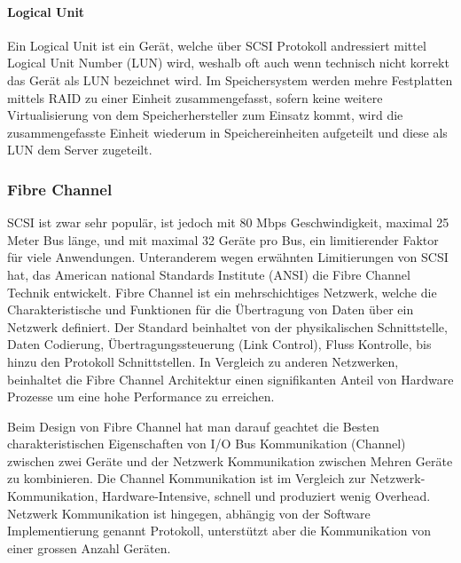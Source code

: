 \paragraph*{Logical Unit}
Ein Logical Unit ist ein Gerät, welche über SCSI Protokoll andressiert mittel Logical Unit Number (LUN) wird, weshalb oft auch wenn technisch nicht korrekt das Gerät als LUN bezeichnet wird. Im Speichersystem werden mehre Festplatten mittels RAID zu einer Einheit zusammengefasst, sofern keine weitere Virtualisierung von dem Speicherhersteller zum Einsatz kommt, wird die zusammengefasste Einheit wiederum in Speichereinheiten aufgeteilt und diese als LUN dem Server zugeteilt.\cite{SNIA2011}

\subsubsection{Fibre Channel}
SCSI ist zwar sehr populär, ist jedoch mit 80 Mbps Geschwindigkeit, maximal 25 Meter Bus länge, und mit maximal 32 Geräte pro Bus, ein limitierender Faktor für viele Anwendungen. Unteranderem wegen erwähnten Limitierungen von SCSI hat, das American national Standards Institute (ANSI) die Fibre Channel Technik entwickelt. Fibre Channel ist ein mehrschichtiges Netzwerk, welche die Charakteristische und Funktionen für die Übertragung von Daten über ein Netzwerk definiert. Der Standard beinhaltet von der physikalischen Schnittstelle, Daten Codierung, Übertragungssteuerung (Link Control), Fluss Kontrolle, bis hinzu den Protokoll Schnittstellen. In Vergleich zu anderen Netzwerken, beinhaltet die Fibre Channel Architektur einen signifikanten Anteil von Hardware Prozesse um eine hohe Performance zu erreichen.\cite{Gupta2002}\cite{Christopher2009}

Beim Design von Fibre Channel hat man darauf geachtet die Besten charakteristischen Eigenschaften von I/O Bus Kommunikation (Channel) zwischen zwei Geräte und der Netzwerk Kommunikation zwischen Mehren Geräte zu kombinieren. Die Channel Kommunikation ist im Vergleich zur Netzwerk-Kommunikation, Hardware-Intensive, schnell und produziert wenig Overhead. Netzwerk Kommunikation ist hingegen, abhängig von der Software Implementierung genannt Protokoll, unterstützt aber die Kommunikation von einer grossen Anzahl Geräten.

